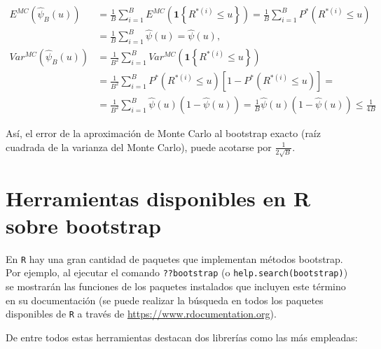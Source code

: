 \documentclass[]{book}
\theoremstyle{break}
\theoremstyle{definition}
\theoremstyle{definition}
\theoremstyle{definition}
\theoremstyle{remark}
\begin{document}
\[\begin{aligned}
E^{MC}\left( \hat{\psi}_{B}\left( u \right) \right) &= \frac{1}{B}
\sum_{i=1}^{B}E^{MC}\left( \mathbf{1}\left\{ R^{\ast (i)}\leq
u\right\} \right) =\frac{1}{B}\sum_{i=1}^{B}P^{\ast}\left( R^{\ast \left(
i \right)}\leq u \right) \\
&= \frac{1}{B}\sum_{i=1}^{B}\hat{\psi}\left( u \right) =\hat{\psi}\left(
u \right), \\
Var^{MC}\left( \hat{\psi}_{B}\left( u \right) \right) &= \frac{1}{B^2}
\sum_{i=1}^{B}Var^{MC}\left( \mathbf{1}\left\{ R^{\ast (i)}\leq
u\right\} \right) \\
&= \frac{1}{B^2}\sum_{i=1}^{B}P^{\ast}\left( R^{\ast (i)
}\leq u \right) \left[ 1-P^{\ast}\left( R^{\ast (i)}\leq
u \right) \right] = \\
&= \frac{1}{B^2}\sum_{i=1}^{B}\hat{\psi}\left( u \right) \left( 1-\hat{\psi}
\left( u \right) \right) =\frac{1}{B}\hat{\psi}\left( u \right) \left( 1-\hat{
\psi}\left( u \right) \right) \leq \frac{1}{4B}
\end{aligned}\]

Así, el error de la aproximación de Monte Carlo al bootstrap exacto
(raíz cuadrada de la varianza del Monte Carlo), puede acotarse por
\(\frac{1}{2\sqrt{B}}\).

\section{Herramientas disponibles en R sobre
bootstrap}\label{intro-paquetes}

En \texttt{R} hay una gran cantidad de paquetes que implementan métodos
bootstrap. Por ejemplo, al ejecutar el comando \texttt{??bootstrap} (o
\texttt{help.search(\textquotesingle{}bootstrap\textquotesingle{})}) se
mostrarán las funciones de los paquetes instalados que incluyen este
término en su documentación (se puede realizar la búsqueda en todos los
paquetes disponibles de \texttt{R} a través de
\url{https://www.rdocumentation.org}).

De entre todos estas herramientas destacan dos librerías como las más
empleadas:
\end{document}
